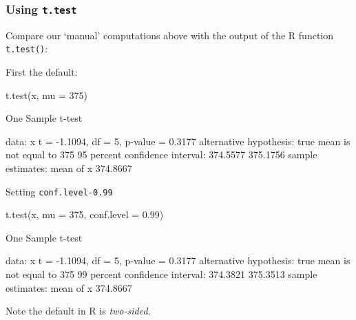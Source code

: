 \documentclass[a4paper]{article}
\begin{document}
\subsubsection{Using \lstinline|t.test|}
Compare our `manual' computations above with the output of the R function \lstinline|t.test()|:\\
\begin{minipage}[t]{0.49\textwidth}
First the default:
\begin{Schunk}
\begin{Sinput}
t.test(x, mu = 375)
\end{Sinput}
\begin{Soutput}

	One Sample t-test

data:  x
t = -1.1094, df = 5, p-value = 0.3177
alternative hypothesis: true mean is not equal to 375
95 percent confidence interval:
 374.5577 375.1756
sample estimates:
mean of x 
 374.8667 
\end{Soutput}
\end{Schunk}
\end{minipage}
\hspace{0.02\textwidth}
\begin{minipage}[t]{0.49\textwidth}
Setting \lstinline|conf.level-0.99|
\begin{Schunk}
\begin{Sinput}
t.test(x, mu = 375, conf.level = 0.99)
\end{Sinput}
\begin{Soutput}

	One Sample t-test

data:  x
t = -1.1094, df = 5, p-value = 0.3177
alternative hypothesis: true mean is not equal to 375
99 percent confidence interval:
 374.3821 375.3513
sample estimates:
mean of x 
 374.8667 
\end{Soutput}
\end{Schunk}
\end{minipage}
Note the default in R is \textit{two-sided}.
\end{document}
